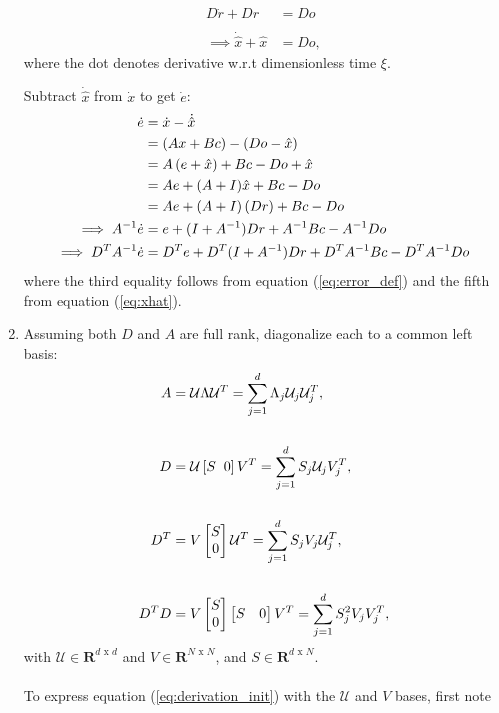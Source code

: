\begin{enumerate}
    \begin{align*}
        D \dot{r} + D r &= Do \\
        \\
        \implies \dot{\hat{x}} + \hat{x} &= Do,
    \end{align*}
    where the dot denotes derivative w.r.t dimensionless time $\xi$.

    Subtract $\dot{\hat{x}}$ from $\dot{x}$ to get $\dot{e}$:
    \begin{align}
    \label{eq:derivation_init}
        \dot{e} &= \dot{x}-\dot{\hat{x}} \notag \\
        &= \left( Ax + Bc \right) - \left( Do - \hat{x} \right) \notag \\
        &= A\left(  e + \hat{x} \right) + Bc - Do + \hat{x} \notag \\
        &= A e + (A + I)\hat{x} + Bc - Do \notag \\
        &=  A e + (A + I) \left(Dr\right) + Bc - Do \notag \\
        \implies A^{-1}\dot{e} &= e + (I + A^{-1}) Dr + A^{-1} Bc - A^{-1}Do \notag \\ 
        \implies D^{T} A^{-1} \dot{e} &= D^T e +D^T (I + A^{-1}) Dr + D^T A^{-1}Bc - D^T A^{-1} D o 
    \end{align}
where the third equality follows from equation (\ref{eq:error_def}) and the fifth from equation (\ref{eq:xhat}).    

\item Assuming both $D$ and $A$ are full rank, diagonalize each to a common left basis:
\begin{align*}
    A &= \mathcal{U} \Lambda \mathcal{U}^T = \sum_{j=1}^d \Lambda_j \mathcal{U}_j \mathcal{U}_j^T,\\
    \\
    D &= \mathcal{U} \left[S \hspace{2mm} 0 \right]  V^T = \sum_{j=1}^d S_j \mathcal{U}_j  V_j^T,\\
    \\
    D^T &= V \begin{bmatrix} S \\ 0\end{bmatrix} \mathcal{U}^T = \sum_{j=1}^d S_j V_j  \mathcal{U}_j^T, \\
    \\
    D^T D  &= V \begin{bmatrix} S \\ 0\end{bmatrix} \begin{bmatrix} S & 0\end{bmatrix} V^T
     = \sum_{j=1}^d S_j^2 V_j V_j^T , 
\end{align*}
with $\mathcal{U} \in \mathbf{R}^{d \text{ x } d}$ and $V \in \mathbf{R}^{N \text{ x } N}$, and $S \in \mathbf{R}^{d \text{ x } N }$. \\
\\
To express equation (\ref{eq:derivation_init}) with the $\mathcal{U}$ and $V$ bases, first note


\end{enumerate}
